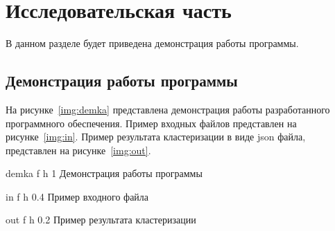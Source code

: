\chapter{Исследовательская часть}

В данном разделе будет приведена демонстрация работы программы.


\section{Демонстрация работы программы}

На рисунке~\ref{img:demka} представлена демонстрация работы разработанного программного обеспечения.
Пример входных файлов представлен на рисунке~\ref{img:in}. 
Пример результата кластеризации в виде json файла, представлен на рисунке~\ref{img:out}.

{demka} %
{f} %
{h} %
{1\textwidth} %
{Демонстрация работы программы} %

{in} %
{f} %
{h} %
{0.4\textwidth} %
{Пример входного файла} %

{out} %
{f} %
{h} %
{0.2\textwidth} %
{Пример результата кластеризации} %

\clearpage

